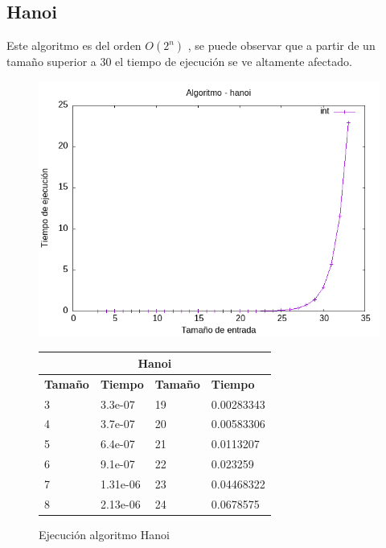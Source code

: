 \documentclass[11pt]{article}
\begin{document}
\subsection*{Hanoi}
Este algoritmo es del orden $O(2^n)$ , se puede observar que a partir de un tamaño superior a 30 el tiempo de ejecución se ve 
altamente afectado.
\begin{figure}[H]
    \begin{minipage}{0.5\textwidth}
        \centering
        \includegraphics[width=\linewidth]{assets/Img/hanoiint.png}
        \caption{Ejecución algoritmo Hanoi}
        \label{fig:hanoi} 
    \end{minipage}%
    \begin{minipage}{0.5\textwidth}
        \centering
        \small
        \begin{tabular}{|l|l|l|l|}
        \hline
            \multicolumn{4}{|c|}{\cellcolor{blue!20}\textbf{Hanoi}} \\ \hline 
            \textbf{Tamaño} & \textbf{Tiempo} & \textbf{Tamaño} & \textbf{Tiempo} \\ \hline
            3 & 3.3e-07 & 19 & 0.00283343 \\ \hline
            4 & 3.7e-07 & 20 & 0.00583306 \\ \hline
            5 & 6.4e-07 & 21 & 0.0113207 \\ \hline
            6 & 9.1e-07 & 22 & 0.023259 \\ \hline
            7 & 1.31e-06 & 23 & 0.04468322 \\ \hline
            8 & 2.13e-06 & 24 & 0.0678575 \\ \hline

\end{tabular}
\end{minipage}
\end{figure}
\end{document}
